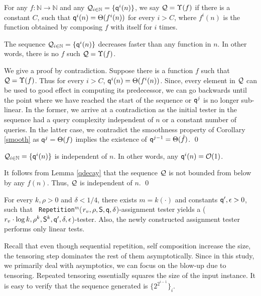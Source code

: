 \begin{definition}[${\cal Q} = \Upsilon(f)$]
  For any $f : \mathbb{N} \rightarrow \mathbb{N}$ and any ${\cal Q}_{i
    \in \mathbb{N}} = \{{\sf q}^{i}(n)\}$, we say ${\cal Q} = \Upsilon(f)$
  if there is a constant $C$, such that ${\sf q}^{i}(n) = \Theta(f^i(n))$
  for every $i > C$, where $f^i(n)$ is the function obtained by
  composing $f$ with itself for $i$ times.
\end{definition}


\begin{lemma}\label{qdecay}
  The sequence ${\cal Q}_{i \in \mathbb{N}} = \{{\sf q}^{i}(n)\}$ decreases
  faster than any function in $n$. In other words, there is no $f$
  such ${\cal Q} = \Upsilon(f)$.
\end{lemma}
 We give a proof by contradiction. Suppose there
is a function $f$ such that ${\cal Q} = \Upsilon(f)$. Thus for every
$i > C$, ${\sf q}^{i}(n) = \Theta(f^i(n))$. Since, every element in ${\cal
  Q}$ can be used to good effect in computing its predecessor, we can
go backwards until the point where we have reached the start of the
sequence or ${\sf q}^j$ is no longer sub-linear. In the former, we arrive
at a contradiction as the initial tester in the sequence had a query
complexity independent of $n$ or a constant number of queries. In the
latter case, we contradict the smoothness property of Corollary
\ref{smooth} as ${\sf q}^j = \Theta({f})$ implies the existence
of ${\sf q}^{j-1} = \Theta(\hat{f})$. \qed

\begin{proposition}\label{constant}
  ${\cal Q}_{i \in \mathbb{N}} = \{{\sf q}^{i}(n)\}$ is independent of
  $n$. In other words, any ${\sf q}^{i}(n) = {\cal O}(1)$.
\end{proposition}
 It follows from Lemma \ref{qdecay} that the
sequence ${\cal Q}$ is not bounded from below by any $f(n)$. Thus,
${\cal Q}$ is independent of $n$. \qed

\begin{theorem}\label{iterateInner}
  For every $k , \rho > 0$ and  $\delta < 1/4$, there exists $m = k(\cdot)$ and
  constants ${\sf q}', \epsilon > 0$, such that {\tt
    Repetition}$^m$($r_v, \rho, {\sf S}, {\sf q}, \delta$)-assignment tester yields a ($r_v
  \cdot \log k, \rho^k, {\sf S}^k, {\sf q}', \delta, \epsilon$)-tester. Also, the newly constructed assignment
 tester performs only linear tests.
\end{theorem}
 Recall that even though sequential repetition,
self composition increase the size, the tensoring step dominates the
rest of them asymptotically. Since in this study, we primarily deal
with asymptotics, we can focus on the blow-up due to
tensoring. Repeated tensoring essentially squares the size of the
input instance. It is easy to verify that the sequence generated is
$\{2^{2^{i-1}}\}_{i}$.

